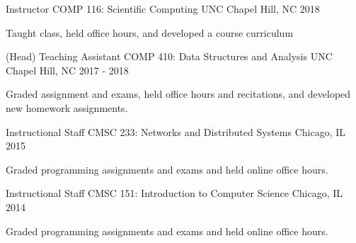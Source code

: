 
\begin{cventries}
  \cventry
    {Instructor} %
    {COMP 116: Scientific Computing} %
    {UNC Chapel Hill, NC} %
    {2018} %
    {
      \begin{cvitems} %
        \item {Taught class, held office hours, and developed a course curriculum}
      \end{cvitems}
    }

  \cventry
    {(Head) Teaching Assistant} %
    {COMP 410: Data Structures and Analysis} %
    {UNC Chapel Hill, NC} %
    {2017 - 2018} %
    {
      \begin{cvitems} %
        \item {Graded assignment and exams, held office hours and recitations, and developed new homework assignments.}
      \end{cvitems}
    }

  \cventry
    {Instructional Staff} %
    {CMSC 233: Networks and Distributed Systems} %
    {Chicago, IL} %
    {2015} %
    {
      \begin{cvitems} %
        \item {Graded programming assignments and exams and held online office hours.}
      \end{cvitems}
    }
	
  \cventry
    {Instructional Staff} %
    {CMSC 151: Introduction to Computer Science} %
    {Chicago, IL} %
    {2014} %
    {
      \begin{cvitems} %
        \item {Graded programming assignments and exams and held online office hours.}
      \end{cvitems}
    }

\end{cventries}